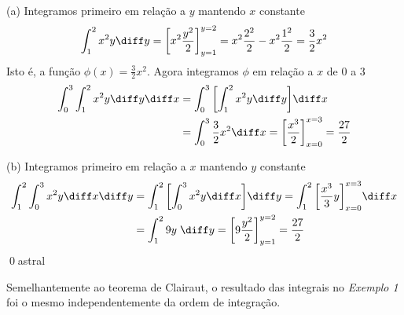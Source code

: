 \documentclass[a4paper, 12pt]{extreport}
\begin{document}
      \noindent (a) Integramos primeiro em relação a $y$ mantendo $x$ constante
      $$ \int_1^2{x^2y}\diff y = \left[x^2\frac{y^2}{2}\right]_{y=1}^{y=2} = x^2\frac{2^2}{2} - x^2\frac{1^2}{2} = \frac{3}{2}x^2 $$
      Isto é, a função $\phi(x) = \frac{3}{2}x^2$. Agora integramos $\phi$ em relação a $x$ de $0$ a $3$
      \begin{equation*}
        \begin{split}
          \int_0^3{\int_1^2{x^2y}\diff y}\diff x & = \int_0^3{\left[\int_1^2{x^2y}\diff y\right]}\diff x \\
                                                 & = \int_0^3{\frac{3}{2}x^2}\diff x = \left[\frac{x^3}{2}\right]_{x=0}^{x=3} = \frac{27}{2}
        \end{split}
      \end{equation*}

      \noindent (b) Integramos primeiro em relação a $x$ mantendo $y$ constante
      \begin{equation*}
        \begin{split}
          \int_1^2{\int_0^3{x^2y}\diff x}\diff y & = \int_1^2{\left[\int_0^3{x^2y}\diff x\right]}\diff y = \int_1^2{\left[\frac{x^3}{3}y\right]_{x=0}^{x=3}}\diff x \\
                                                 & = \int_1^2{9y\hspace{1mm}\diff y} = \left[9\frac{y^2}{2}\right]_{y=1}^{y=2} = \frac{27}{2}
        \end{split}
      \end{equation*}
      \qed{astral}

      Semelhantemente ao teorema de Clairaut, o resultado das integrais no \textsl{Exemplo 1} foi o mesmo independentemente da ordem de integração.

        \vspace{4mm}
        \noindent {}
\end{document}
